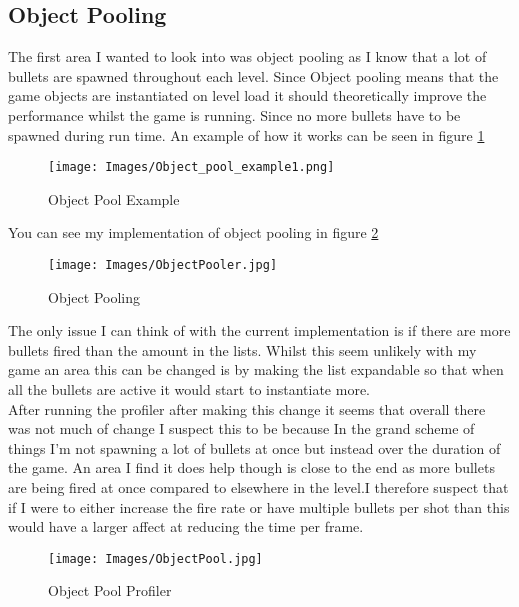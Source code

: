 \documentclass{article}
\begin{document}
\subsection{Object Pooling}
The first area I wanted to look into was object pooling as I know that a lot of bullets are spawned throughout each level. Since Object pooling means that the game objects are instantiated on level load it should theoretically improve the performance whilst the game is running. Since no more bullets have to be spawned during run time. An example of how it works can be seen in figure \ref{fig:objectpoolexample}

\begin{figure}[!ht]
    \centering
    \texttt{[image: Images/Object\_pool\_example1.png]}
    \caption{Object Pool Example \cite{ObjectPool}}
    \label{fig:objectpoolexample}
\end{figure} 

You can see my implementation of object pooling in figure \ref{fig:ObjectPooler}\\

\begin{figure}[!ht]
    \centering
    \texttt{[image: Images/ObjectPooler.jpg]}
    \caption{Object Pooling}
    \label{fig:ObjectPooler}
\end{figure}

The only issue I can think of with the current implementation is if there are more bullets fired than the amount in the lists. Whilst this seem unlikely with my game an area this can be changed is by making the list expandable so that when all the bullets are active it would start to instantiate more.\newline
\\
After running the profiler after making this change it seems that overall there was not much of change I suspect this to be because In the grand scheme of things I'm not spawning a lot of bullets at once but instead over the duration of the game. An area I find it does help though is close to the end as more bullets are being fired at once compared to elsewhere in the level.I therefore suspect that if I were to either increase the fire rate or have multiple bullets per shot than this would have a larger affect at reducing the time per frame. 

\begin{figure}[!ht]
    \centering
    \texttt{[image: Images/ObjectPool.jpg]}
    \caption{Object Pool Profiler}
    \label{fig:ObjectPoolProfile}
\end{figure}
\newpage
\end{document}
